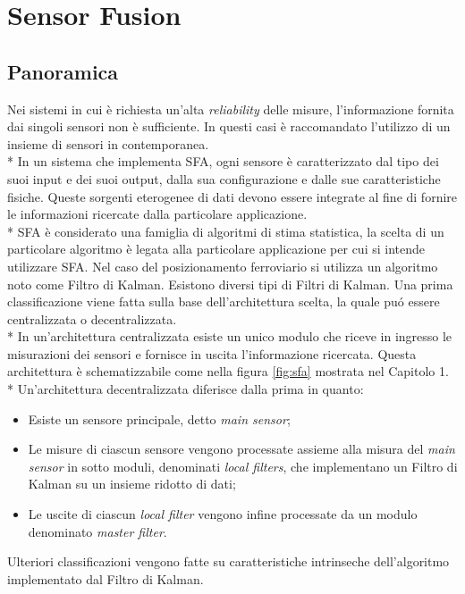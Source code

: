 \chapter{Sensor Fusion}
\section{Panoramica}
Nei sistemi in cui \`e richiesta un'alta \emph{reliability} delle misure, l'informazione fornita dai singoli sensori non \`e sufficiente. In questi casi \`e raccomandato l'utilizzo di un insieme di sensori in contemporanea.\\*
In un sistema che implementa SFA, ogni sensore \`e caratterizzato dal tipo dei suoi input e dei suoi output, dalla sua configurazione e dalle sue caratteristiche fisiche. Queste sorgenti eterogenee di dati devono essere integrate al fine di fornire le informazioni ricercate dalla particolare applicazione.\\*
SFA \`e considerato una famiglia di algoritmi di stima statistica, la scelta di un particolare algoritmo \`e legata alla particolare applicazione per cui si intende utilizzare SFA. Nel caso del posizionamento ferroviario si utilizza un algoritmo noto come Filtro di Kalman.
Esistono diversi tipi di Filtri di Kalman. Una prima classificazione viene fatta sulla base dell'architettura scelta, la quale pu\'o essere centralizzata o decentralizzata.\\*
In un'architettura centralizzata esiste un unico modulo che riceve in ingresso le misurazioni dei sensori e fornisce in uscita l'informazione ricercata. Questa architettura \`e schematizzabile come nella figura \ref{fig:sfa} mostrata nel Capitolo 1.\\*
Un'architettura decentralizzata diferisce dalla prima in quanto:
\begin{itemize}
	\item Esiste un sensore principale, detto \emph{main sensor};
	\item Le misure di ciascun sensore vengono processate assieme alla misura del \emph{main sensor} in sotto moduli, denominati \emph{local filters}, che implementano un Filtro di Kalman su un insieme ridotto di dati;
	\item Le uscite di ciascun \emph{local filter} vengono infine processate da un modulo denominato \emph{master filter}.
\end{itemize}
Ulteriori classificazioni vengono fatte su caratteristiche intrinseche dell'algoritmo implementato dal Filtro di Kalman.
